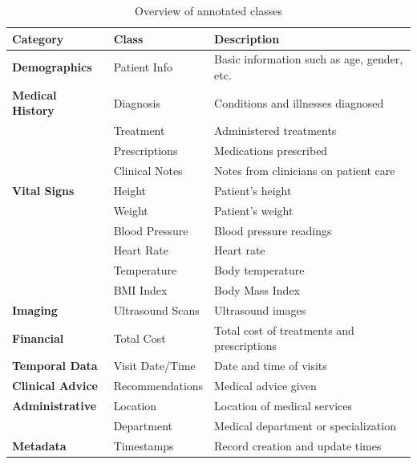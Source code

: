 \documentclass[conference]{IEEEtran}
\begin{document}
\begin{itemize}
        \begin{table}[htbp]
        \centering
        \addtolength{\tabcolsep}{4pt}
        \def\arraystretch{1.5}
        \caption{\textnormal{Overview of annotated classes}}
        \label{tab:classes}
        \begin{tabular}{l l p{3cm}}
            \hline
            \textbf{Category} & \textbf{Class} & \textbf{Description} \\
            \hline
            \textbf{Demographics} & Patient Info & Basic information such as age, gender, etc. \\
            \hline
            \textbf{Medical History} & Diagnosis & Conditions and illnesses diagnosed \\
            & Treatment & Administered treatments \\
            & Prescriptions & Medications prescribed \\
            & Clinical Notes & Notes from clinicians on patient care \\
            \hline
            \textbf{Vital Signs} & Height & Patient's height \\
            & Weight & Patient's weight \\
            & Blood Pressure & Blood pressure readings \\
            & Heart Rate & Heart rate \\
            & Temperature & Body temperature \\
            & BMI Index & Body Mass Index \\
            \hline
            \textbf{Imaging} & Ultrasound Scans & Ultrasound images \\
            \hline
            \textbf{Financial} & Total Cost & Total cost of treatments and prescriptions \\
            \hline
            \textbf{Temporal Data} & Visit Date/Time & Date and time of visits \\
            \hline
            \textbf{Clinical Advice} & Recommendations & Medical advice given \\
            \hline
            \textbf{Administrative} & Location & Location of medical services \\
            & Department & Medical department or specialization \\
            \hline
            \textbf{Metadata} & Timestamps & Record creation and update times \\
            \hline            
            \end{tabular}        
        \end{table}
    

\end{itemize}
\end{document}
